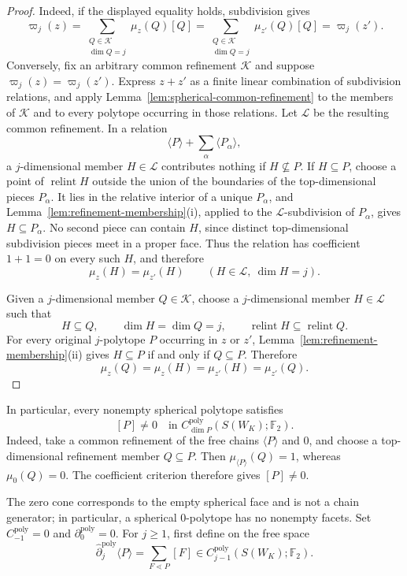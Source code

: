 \documentclass[reqno,12pt]{amsart}
\theoremstyle{definition}
\DeclareMathOperator{\relint}{relint}
\newcommand{\F}{\mathbb F_2}
\begin{document}
\begin{proof}
Indeed, if the displayed equality holds, subdivision gives
\[
 \varpi_j(z)
     =\sum_{\substack{Q\in\mathcal K\\\dim Q=j}}\mu_z(Q)[Q]
     =\sum_{\substack{Q\in\mathcal K\\\dim Q=j}}\mu_{z'}(Q)[Q]
     =\varpi_j(z').
\]
Conversely, fix an arbitrary common refinement \(\mathcal K\) and
suppose \(\varpi_j(z)=\varpi_j(z')\).  Express \(z+z'\) as a finite
linear combination
of subdivision relations, and apply
Lemma~\ref{lem:spherical-common-refinement} to the members of
\(\mathcal K\) and to every polytope occurring in those relations.
Let \(\mathcal L\) be the resulting common refinement.  In a relation
\[
 \langle P\rangle+\sum_\alpha\langle P_\alpha\rangle,
\]
a \(j\)-dimensional member \(H\in\mathcal L\) contributes nothing if
\(H\not\subseteq P\).  If \(H\subseteq P\), choose a point of
\(\relint H\) outside the union of the boundaries of the
top-dimensional pieces \(P_\alpha\).  It lies in the relative interior
of a unique \(P_\alpha\), and
Lemma~\ref{lem:refinement-membership}(i), applied to the
\(\mathcal L\)-subdivision of \(P_\alpha\), gives
\(H\subseteq P_\alpha\).  No second piece can contain \(H\), since
distinct top-dimensional subdivision pieces meet in a proper face.
Thus the relation has coefficient \(1+1=0\) on every such \(H\), and
therefore
\[
 \mu_z(H)=\mu_{z'}(H)
 \qquad(H\in\mathcal L,\ \dim H=j).
\]

 Given a \(j\)-dimensional member \(Q\in\mathcal K\), choose a
 \(j\)-dimensional member
 \(H\in\mathcal L\) such that
 \[
  H\subseteq Q,\qquad \dim H=\dim Q=j,\qquad
  \relint H\subseteq\relint Q.
 \]
 For every original \(j\)-polytope \(P\) occurring in \(z\) or
 \(z'\), Lemma~\ref{lem:refinement-membership}(ii) gives
 \(H\subseteq P\) if and only if \(Q\subseteq P\).  Therefore
\[
 \mu_z(Q)=\mu_z(H)=\mu_{z'}(H)=\mu_{z'}(Q).
\]
\end{proof}

In particular, every nonempty spherical polytope satisfies
\[
 [P]\ne0\quad\text{in }C_{\dim P}^{\mathrm{poly}}(S(W_K);\F).
\]
Indeed, take a common refinement of the free chains
\(\langle P\rangle\) and \(0\),
and choose a top-dimensional refinement member \(Q\subseteq P\).
Then
\(\mu_{\langle P\rangle}(Q)=1\), whereas \(\mu_0(Q)=0\).  The
coefficient criterion therefore gives \([P]\ne0\).

The zero cone corresponds to the empty spherical face and is not a
chain generator; in particular, a spherical \(0\)-polytope has no
nonempty facets.  Set \(C_{-1}^{\mathrm{poly}}=0\) and
\(\partial_0^{\mathrm{poly}}=0\).  For \(j\geq1\), first define on the
free space
\[
 \widehat\partial_j^{\mathrm{poly}}\langle P\rangle
 =\sum_{F\lessdot P}[F]
 \in C_{j-1}^{\mathrm{poly}}(S(W_K);\F).
\]
\end{document}
